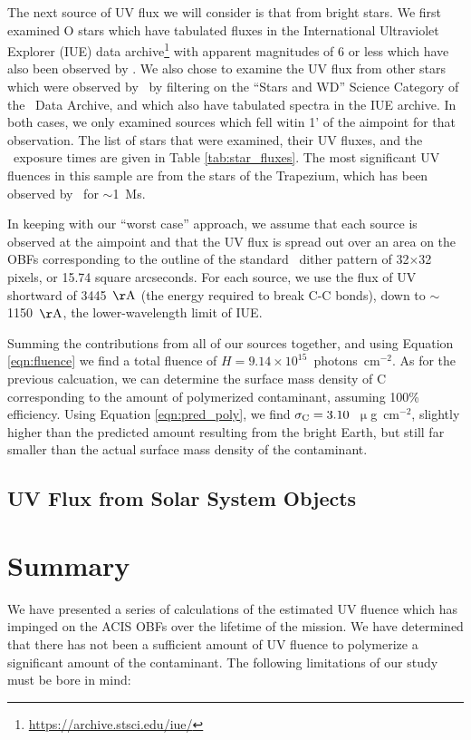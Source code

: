 \documentclass[11pt]{article}
\begin{document}
The next source of UV flux we will consider is that from bright stars. We first examined O stars which have tabulated fluxes in the International Ultraviolet Explorer (IUE) data archive\footnote{\url{https://archive.stsci.edu/iue/}} with apparent magnitudes of 6 or less which have also been observed by \chandra. We also chose to examine the UV flux from other stars which were observed by \chandra~by filtering on the ``Stars and WD'' Science Category of the \chandra~Data Archive, and which also have tabulated spectra in the IUE archive. In both cases, we only examined sources which fell witin 1' of the aimpoint for that observation. The list of stars that were examined, their UV fluxes, and the \chandra~exposure times are given in Table \ref{tab:star_fluxes}. The most significant UV fluences in this sample are from the stars of the Trapezium, which has been observed by \chandra~for $\sim$1~Ms.



In keeping with our ``worst case'' approach, we assume that each source is observed at the aimpoint and that the UV flux is spread out over an area on the OBFs corresponding to the outline of the standard \chandra~dither pattern of 32$\times$32 pixels, or 15.74 square arcseconds. For each source, we use the flux of UV shortward of 3445~${\rm \AA}$ (the energy required to break C-C bonds), down to $\sim$1150~${\rm \AA}$, the lower-wavelength limit of IUE.

Summing the contributions from all of our sources together, and using Equation \ref{eqn:fluence} we find a total fluence of $H = 9.14 \times 10^{15}$~photons~cm$^{-2}$. As for the previous calcuation, we can determine the surface mass density of C corresponding to the amount of polymerized contaminant, assuming 100\% efficiency. Using Equation \ref{eqn:pred_poly}, we find $\sigma_{\rm C} = 3.10$~$\upmu$g~cm$^{-2}$, slightly higher than the predicted amount resulting from the bright Earth, but still far smaller than the actual surface mass density of the contaminant.

\subsection{UV Flux from Solar System Objects}

\section{Summary}

We have presented a series of calculations of the estimated UV fluence which has impinged on the ACIS OBFs
over the lifetime of the mission. We have determined that there has not been a sufficient amount of UV fluence
to polymerize a significant amount of the contaminant. The following limitations of our study must be bore in mind:
\end{document}
